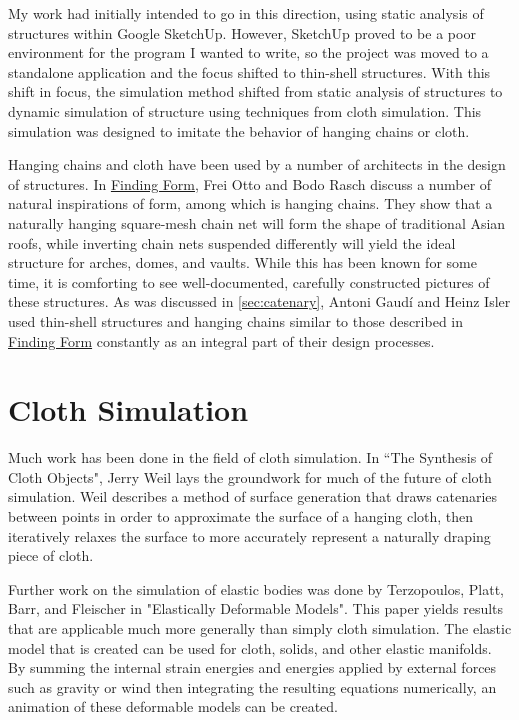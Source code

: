 \documentclass{thesis}
\begin{document}
My work had initially intended to go in this direction, using static analysis of structures within
Google SketchUp.  However, SketchUp proved to be a poor environment for the program I wanted to write, so
the project was moved to a standalone application and the focus shifted to thin-shell structures.  With this
shift in focus, the simulation method shifted from static analysis of structures to dynamic simulation of
structure using techniques from cloth simulation.  This simulation was designed to imitate the behavior of
hanging chains or cloth.

Hanging chains and cloth have been used by a number of architects in the design of structures.  In
\underline{Finding Form}\cite{otto95findingform}, Frei Otto and Bodo Rasch discuss a number of natural inspirations of form, among which
is hanging chains.  They show that a naturally hanging square-mesh chain net will form the shape of
traditional Asian roofs, while inverting chain nets suspended differently will yield the ideal structure
for arches, domes, and vaults.  While this has been known for some time, it is comforting to see
well-documented, carefully constructed pictures of these structures.  As was discussed in \ref{sec:catenary},
Antoni Gaud\'{i} and Heinz Isler used thin-shell structures and hanging chains similar to those described in
\underline{Finding Form} constantly as an integral part of their design processes.
\nocite{charleson05structasarch}

\section{Cloth Simulation}
Much work has been done in the field of cloth simulation.  In ``The Synthesis of Cloth
Objects"\cite{weil86synthcloth}, Jerry Weil lays the groundwork for much of the future of cloth simulation.
Weil describes a method of surface generation that draws catenaries between points in order to approximate
the surface of a hanging cloth, then iteratively relaxes the surface to more accurately represent a
naturally draping piece of cloth.

Further work on the simulation of elastic bodies was done by Terzopoulos, Platt, Barr, and Fleischer in
"Elastically Deformable Models"\cite{terzopoulos87elastic}.  This paper yields results that are applicable
much more generally than simply cloth simulation.  The elastic model that is created can be used for cloth,
solids, and other elastic manifolds.  By summing the internal strain energies and energies applied by
external forces such as gravity or wind then integrating the resulting equations numerically, an animation
of these deformable models can be created.
\end{document}
